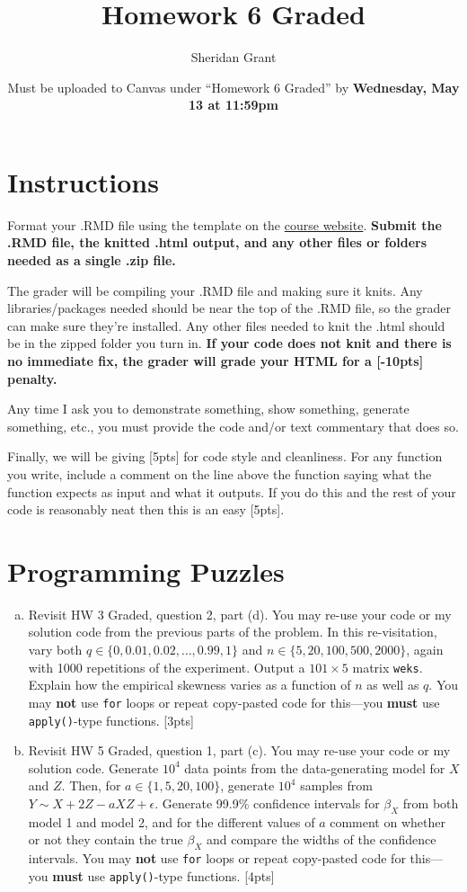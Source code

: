 \documentclass[12pt]{article}
\title{Homework 6 Graded}
\author{Sheridan Grant}
\date{Must be uploaded to Canvas under ``Homework 6 Graded'' by \textbf{Wednesday, May 13 at 11:59pm}}
\begin{document}
\sloppy

\maketitle

\section*{Instructions}

Format your .RMD file using the template on the \href{https://sheridanlgrant.github.io/teaching/STAT302_SPR2020}{course website}. \textbf{Submit the .RMD file, the knitted .html output, and any other files or folders needed as a single .zip file.}

The grader will be compiling your .RMD file and making sure it knits. Any libraries/packages needed should be near the top of the .RMD file, so the grader can make sure they're installed. Any other files needed to knit the .html should be in the zipped folder you turn in. \textbf{If your code does not knit and there is no immediate fix, the grader will grade your HTML for a [-10pts] penalty.}

Any time I ask you to demonstrate something, show something, generate something, etc., you must provide the code and/or text commentary that does so.

Finally, we will be giving [5pts] for code style and cleanliness. For any function you write, include a comment on the line above the function saying what the function expects as input and what it outputs. If you do this and the rest of your code is reasonably neat then this is an easy [5pts].

\section{Programming Puzzles}

\begin{enumerate}[(a)]
	\item Revisit HW 3 Graded, question 2, part (d). You may re-use your code or my solution code from the previous parts of the problem. In this re-visitation, vary both $q \in \{0, 0.01, 0.02,\ldots,0.99,1\}$ and $n \in \{5,20,100,500,2000\}$, again with 1000 repetitions of the experiment. Output a $101 \times 5$ matrix \verb|weks|. Explain how the empirical skewness varies as a function of $n$ as well as $q$. You may \textbf{not} use \verb|for| loops or repeat copy-pasted code for this---you \textbf{must} use \verb|apply()|-type functions. [3pts]
	\item Revisit HW 5 Graded, question 1, part (c). You may re-use your code or my solution code. Generate $10^4$ data points from the data-generating model for $X$ and $Z$. Then, for $a \in \{1,5,20,100\}$, generate $10^4$ samples from $Y \sim X + 2Z - aXZ + \epsilon$. Generate 99.9\% confidence intervals for $\beta_X$ from both model 1 and model 2, and for the different values of $a$ comment on whether or not they contain the true $\beta_X$ and compare the widths of the confidence intervals. You may \textbf{not} use \verb|for| loops or repeat copy-pasted code for this---you \textbf{must} use \verb|apply()|-type functions. [4pts]
\end{enumerate}
\end{document}
